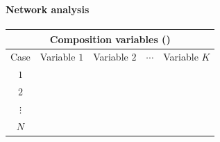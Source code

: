 \documentclass[8pt]{beamer}
\begin{document}
\begin{frame}
\frametitle{\insertsection}
\framesubtitle{Network analysis}

\footnotesize
\centering
\begin{tabular}{ccccc}
\multicolumn{5}{c}{Composition variables ({\color{blue}{attributes}})}\\
\toprule
Case & Variable $1$ & Variable $2$ & $\cdots$ & Variable $K$\\
\hline
$1$           \\
$2$           \\
$\vdots$      \\
$N$           \\
\bottomrule
\end{tabular}

\medskip
\medskip
\medskip
\medskip



\end{frame}

\end{document}
